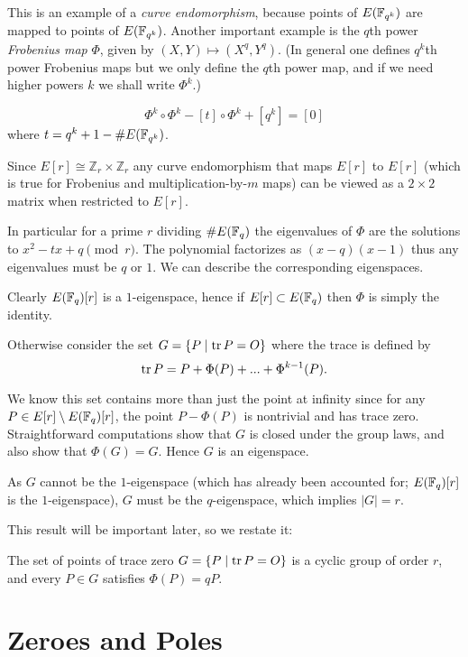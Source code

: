 This is an example of a \emph{curve endomorphism}, because points of
$E(\mathbb{F}_{q^k})$ are mapped to points of $E(\mathbb{F}_{q^k})$. Another important example
is the $q$th power \emph{Frobenius map} $\Phi$,
given by $(X, Y) \mapsto (X^{q}, Y^{q})$. (In general one defines
$q^k$th power Frobenius maps but we only define the $q$th power map,
and if we need higher powers $k$ we shall write $\Phi^k$.)

\begin{theorem}
[Hasse]
\[ \Phi^k \circ \Phi^k - [t] \circ \Phi^k + [q^k] = [0] \]
where $t = q^k + 1 - \#E(\mathbb{F}_{q^k})$.
\end{theorem}

Since $E[r] \cong \mathbb{Z}_r \times \mathbb{Z}_r$ any curve endomorphism
that maps $E[r]$ to $E[r]$ (which is true for Frobenius and
multiplication-by-$m$ maps)
can be viewed as a $2\times 2$ matrix when restricted to $E[r]$.

In particular for a prime $r$ dividing $\#E(\mathbb{F}_q)$ the eigenvalues
of $\Phi$ are the solutions to $x^2 - t x + q \pmod{r}$.
The polynomial factorizes as $(x - q)(x - 1)$ thus any eigenvalues
must be $q$ or $1$. We can describe the corresponding eigenspaces.

Clearly $E(\mathbb{F}_q)[r]$ is a $1$-eigenspace, hence if $E[r] \subset E(\mathbb{F}_q)$
then $\Phi$ is simply the identity.

Otherwise consider the set $G = \{P \mid \mathop{\rm tr} P = O \}$
where the trace is defined by
\[ \mathop{\rm tr} P = P + \Phi(P) + ... + \Phi^{k-1}(P)  .\]

We know this set contains more than just the point at infinity
since for any $P \in E[r] \setminus E(\mathbb{F}_q)[r]$,
the point $P - \Phi(P)$ is nontrivial and has trace zero.
Straightforward computations show that $G$ is closed under the group laws,
and also show that $\Phi(G) = G$. Hence $G$ is an eigenspace.

As $G$ cannot be the $1$-eigenspace (which has already been accounted for;
$E(\mathbb{F}_q)[r]$ is the $1$-eigenspace), $G$ must be the $q$-eigenspace,
which implies $|G| = r$.

This result will be important later, so we restate it:

\begin{theorem}
The set of points of trace zero
$G = \{P \mid \mathop{\rm tr} P = O \}$ is a cyclic group of order $r$,
and every $P \in G$ satisfies $\Phi(P) = q P$.
\end{theorem}

\section {Zeroes and Poles}

